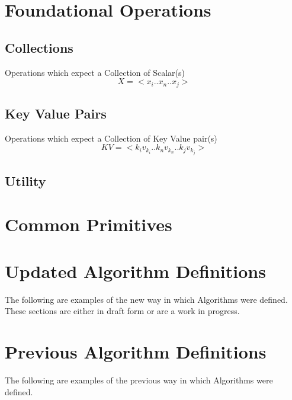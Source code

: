 \documentclass{article}
\begin{document}




\section{Foundational Operations}
\subsection{Collections}
Operations which expect a Collection of Scalar(s)
$$X = <x_{i}..x_{n}..x_{j}>$$





\subsection{Key Value Pairs}
Operations which expect a Collection of Key Value pair(s)
$$KV = <k_{i}v_{k_{i}}..k_{n}v_{k_{n}}..k_{j}v_{k_{j}}>$$





\subsection{Utility}







\section{Common Primitives}




\section*{Updated Algorithm Definitions}
The following are examples of the new way in which Algorithms were defined. These sections are either in draft form or are a work in progress.





\section*{Previous Algorithm Definitions}
The following are examples of the previous way in which Algorithms were defined.






\end{document}
